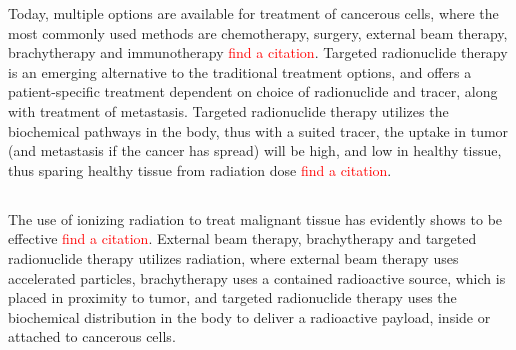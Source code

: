 \documentclass[a4paper,11pt,twoside]{book}
\begin{document}
Today, multiple options are available for treatment of cancerous cells, where the most commonly used methods are chemotherapy, surgery, external beam therapy, brachytherapy and immunotherapy \textcolor{red}{find a citation}. Targeted radionuclide therapy is an emerging alternative to the traditional treatment options, and offers a patient-specific treatment dependent on choice of radionuclide and tracer, along with treatment of metastasis.  Targeted radionuclide therapy utilizes the biochemical pathways in the body, thus with a suited tracer, the uptake in tumor (and metastasis if the cancer has spread) will be high, and low in healthy tissue, thus sparing healthy tissue from radiation dose \textcolor{red}{find a citation}.   \\ 



\subsection*{}

The use of ionizing radiation to treat malignant tissue has evidently shows to be effective \textcolor{red}{find a citation}. External beam therapy, brachytherapy and targeted radionuclide therapy utilizes radiation, where external beam therapy uses accelerated particles, brachytherapy uses a contained radioactive source, which is placed in proximity to tumor, and targeted radionuclide therapy uses the biochemical distribution in the body to deliver a radioactive payload, inside or attached to cancerous cells. \\
\end{document}
